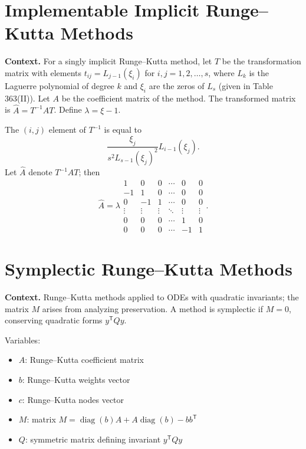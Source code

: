 \section{Implementable Implicit Runge–Kutta Methods}

\noindent\textbf{Context.}
For a singly implicit Runge--Kutta method, let $T$ be the transformation matrix with elements $t_{ij}=L_{j-1}(\xi_i)$ for $i,j=1,2,\dots,s$, where $L_k$ is the Laguerre polynomial of degree $k$ and $\xi_i$ are the zeros of $L_s$ (given in Table 363(II)). Let $A$ be the coefficient matrix of the method. The transformed matrix is $\widehat{A}=T^{-1}AT$. Define $\lambda=\xi-1$.

\begin{theorem}

  \label{thm:363A}
The $(i, j)$ element of $T^{-1}$ is equal to
\[
\frac{\xi_j}{s^2 L_{s-1}(\xi_j)^2} L_{i-1}(\xi_j). \tag{363d}
\]
Let $\widehat{A}$ denote $T^{-1}AT$; then
\[
\widehat{A} = \lambda
\begin{array}{cccccc}
1 & 0 & 0 & \cdots & 0 & 0 \\
-1 & 1 & 0 & \cdots & 0 & 0 \\
0 & -1 & 1 & \cdots & 0 & 0 \\
\vdots & \vdots & \vdots & \ddots & \vdots & \vdots \\
0 & 0 & 0 & \cdots & 1 & 0 \\
0 & 0 & 0 & \cdots & -1 & 1
\end{array}. \tag{363e}
\]
\end{theorem}

\section{Symplectic Runge–Kutta Methods}

\noindent\textbf{Context.}
Runge--Kutta methods applied to ODEs with quadratic invariants; the matrix $M$ arises from analyzing preservation. A method is symplectic if $M=0$, conserving quadratic forms $y^{\mathsf T}Q y$.

Variables:
\begin{itemize}
    \item $A$: Runge--Kutta coefficient matrix
    \item $b$: Runge--Kutta weights vector
    \item $c$: Runge--Kutta nodes vector
    \item $M$: matrix $M=\operatorname{diag}(b)A+A\operatorname{diag}(b)-bb^{\mathsf T}$
    \item $Q$: symmetric matrix defining invariant $y^{\mathsf T}Q y$
\end{itemize}

